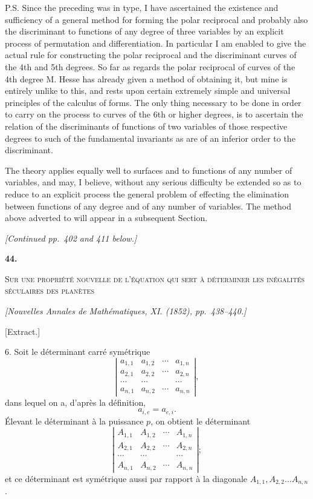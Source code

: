 \documentclass[11pt]{article}
\newcommand{\paperhead}[3]{%
  \clearpage
  \begin{center}
  {\Large\bfseries #1.}\par\vspace{0.85em}
  {\large\scshape #2}\par\vspace{0.6em}
  {\itshape [#3]}\par
  \end{center}\vspace{0.4em}}
\newcommand{\sourcepage}[1]{\marginpar{\scriptsize p.~#1}}
\begin{document}
\sourcepage{363}
P.S. Since the preceding was in type, I have ascertained the existence and sufficiency of a general method for forming the polar reciprocal and probably also the discriminant to functions of any degree of three variables by an explicit process of permutation and differentiation. In particular I am enabled to give the actual rule for constructing the polar reciprocal and the discriminant curves of the 4th and 5th degrees. So far as regards the polar reciprocal of curves of the 4th degree M. Hesse has already given a method of obtaining it, but mine is entirely unlike to this, and rests upon certain extremely simple and universal principles of the calculus of forms. The only thing necessary to be done in order to carry on the process to curves of the 6th or higher degrees, is to ascertain the relation of the discriminants of functions of two variables of those respective degrees to such of the fundamental invariants as are of an inferior order to the discriminant.

The theory applies equally well to surfaces and to functions of any number of variables, and may, I believe, without any serious difficulty be extended so as to reduce to an explicit process the general problem of effecting the elimination between functions of any degree and of any number of variables. The method above adverted to will appear in a subsequent Section.

\begin{center}\emph{[Continued pp.~402 and 411 below.]}\end{center}

\paperhead{44}{Sur une propriété nouvelle de l'équation qui sert à déterminer les inégalités séculaires des planètes}{Nouvelles Annales de Mathématiques, XI. (1852), pp.~438--440.}

\begin{center}[Extract.]\end{center}

\sourcepage{364}
6. Soit le déterminant carré symétrique
\[
\left|\begin{array}{cccc}
a_{1,1}&a_{1,2}&\cdots&a_{1,n}\\
a_{2,1}&a_{2,2}&\cdots&a_{2,n}\\
\cdots&\cdots&&\cdots\\
a_{n,1}&a_{n,2}&\cdots&a_{n,n}
\end{array}\right|,
\tag{M}
\]
dans lequel on a, d'après la définition,
\[
a_{i,e}=a_{e,i}.
\]
Élevant le déterminant à la puissance $p$, on obtient le déterminant
\[
\left|\begin{array}{cccc}
A_{1,1}&A_{1,2}&\cdots&A_{1,n}\\
A_{2,1}&A_{2,2}&\cdots&A_{2,n}\\
\cdots&\cdots&&\cdots\\
A_{n,1}&A_{n,2}&\cdots&A_{n,n}
\end{array}\right|;
\tag{N}
\]
et ce déterminant est symétrique aussi par rapport à la diagonale $A_{1,1},A_{2,2}\ldots A_{n,n}$.
\end{document}
